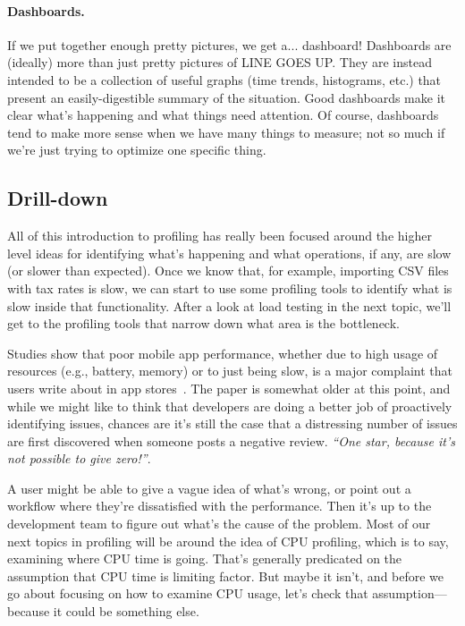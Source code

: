 \paragraph{Dashboards.} If we put together enough pretty pictures, we get a... dashboard! Dashboards are (ideally) more than just pretty pictures of LINE GOES UP. They are instead intended to be a collection of useful graphs (time trends, histograms, etc.) that present an easily-digestible summary of the situation. Good dashboards make it clear what's happening and what things need attention. Of course, dashboards tend to make more sense when we have many things to measure; not so much if we're just trying to optimize one specific thing.

\subsection*{Drill-down}
All of this introduction to profiling has really been focused around the higher level ideas for identifying what's happening and what operations, if any, are slow (or slower than expected). Once we know that, for example, importing CSV files with tax rates is slow, we can start to use some profiling tools to identify what is slow inside that functionality. After a look at load testing in the next topic, we'll get to the profiling tools that narrow down what area is the bottleneck.

Studies show that poor mobile app performance, whether due to high usage of resources (e.g., battery, memory) or to just being slow, is a major complaint that users write about in app stores~\cite{free-apps}. The paper is somewhat older at this point, and while we might like to think that developers are doing a better job of proactively identifying issues, chances are it's still the case that a distressing number of issues are first discovered when someone posts a negative review. \textit{``One star, because it's not possible to give zero!''}.

A user might be able to give a vague idea of what's wrong, or point out a workflow where they're dissatisfied with the performance. Then it's up to the development team to figure out what's the cause of the problem. Most of our next topics in profiling will be around the idea of CPU profiling, which is to say, examining where CPU time is going. That's generally predicated on the assumption that CPU time is limiting factor. But maybe it isn't, and before we go about focusing on how to examine CPU usage, let's check that assumption---because it could be something else.


